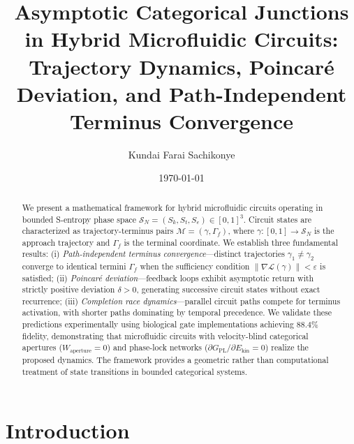 \documentclass[aps,prl,twocolumn,superscriptaddress,showpacs]{revtex4-2}
\newcommand{\Sspace}{\mathcal{S}}
\newcommand{\Sk}{S_k}
\newcommand{\St}{S_t}
\newcommand{\Se}{S_e}
\newcommand{\Gfree}{G_{\text{PL}}}
\newcommand{\Ekin}{E_{\text{kin}}}
\newcommand{\Wapert}{W_{\text{aperture}}}
\newcommand{\traj}{\gamma}
\newcommand{\term}{\Gamma}
\begin{document}
\title{Asymptotic Categorical Junctions in Hybrid Microfluidic Circuits: \\
Trajectory Dynamics, Poincar\'{e} Deviation, and Path-Independent Terminus Convergence}

\author{Kundai Farai Sachikonye}

\date{\today}

\begin{abstract}
We present a mathematical framework for hybrid microfluidic circuits operating in bounded S-entropy phase space $\Sspace_N = (\Sk, \St, \Se) \in [0,1]^3$. Circuit states are characterized as trajectory-terminus pairs $\mathcal{M} = (\traj, \term_f)$, where $\traj: [0,1] \to \Sspace_N$ is the approach trajectory and $\term_f$ is the terminal coordinate. We establish three fundamental results: (i) \emph{Path-independent terminus convergence}---distinct trajectories $\traj_1 \neq \traj_2$ converge to identical termini $\term_f$ when the sufficiency condition $\|\nabla \mathcal{L}(\traj)\| < \varepsilon$ is satisfied; (ii) \emph{Poincar\'{e} deviation}---feedback loops exhibit asymptotic return with strictly positive deviation $\delta > 0$, generating successive circuit states without exact recurrence; (iii) \emph{Completion race dynamics}---parallel circuit paths compete for terminus activation, with shorter paths dominating by temporal precedence. We validate these predictions experimentally using biological gate implementations achieving 88.4\% fidelity, demonstrating that microfluidic circuits with velocity-blind categorical apertures ($\Wapert = 0$) and phase-lock networks ($\partial \Gfree / \partial \Ekin = 0$) realize the proposed dynamics. The framework provides a geometric rather than computational treatment of state transitions in bounded categorical systems.
\end{abstract}

\maketitle

\section{Introduction}
\label{sec:intro}
\end{document}
